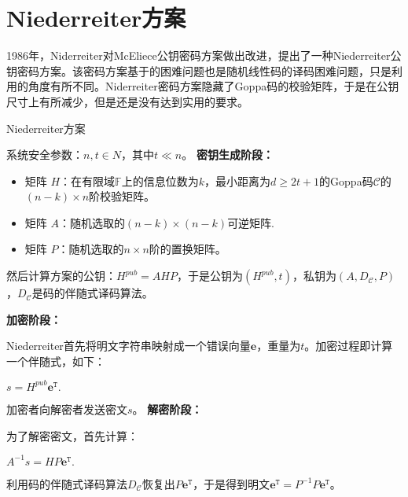 \section{Niederreiter方案}
1986年，Niderreiter对McEliece公钥密码方案做出改进，提出了一种Niederreiter公钥密码方案。该密码方案基于的困难问题也是随机线性码的译码困难问题，只是利用的角度有所不同。Niderreiter密码方案隐藏了Goppa码的校验矩阵，于是在公钥尺寸上有所减少，但是还是没有达到实用的要求。

\begin{breakablealgorithm}
	\small
	\renewcommand{\algorithmicrequire}{\textbf{Input:}}
	\renewcommand{\algorithmicensure}{\textbf{Output:}}
	\caption{Niederreiter方案}
	\label{alg:Niederreiter}
	\begin{algorithmic}
		\State
		系统安全参数：$n,t \in N$，其中$t \ll n$。
		\State
		\textbf{密钥生成阶段：}
		
		\begin{itemize}
			\item 矩阵 $H$：在有限域$\mathbb{F}$上的信息位数为$k$，最小距离为$d \geq 2t + 1$的Goppa码$\mathcal{C}$的$(n-k) \times n$阶校验矩阵。
			\item 矩阵 $A$：随机选取的$(n-k) \times (n-k)$可逆矩阵.
			\item 矩阵 $P$：随机选取的$n \times n$阶的置换矩阵。			
		\end{itemize}
	
		然后计算方案的公钥：$H^{pub} = AHP$，于是公钥为$(H^{pub}, t)$，私钥为$(A,D_\mathcal{C},P)$，$D_\mathcal{C}$是码的伴随式译码算法。
		
		\State
		\textbf{加密阶段：}
		
		Niederreiter首先将明文字符串映射成一个错误向量$\mathbf{e}$，重量为$t$。加密过程即计算一个伴随式，如下：
		
		\begin{center}
			$s = H^{pub}\mathbf{e}^\mathtt{T}.$
		\end{center}
		
		加密者向解密者发送密文$s$。
		\State
		\textbf{解密阶段：}
		
		为了解密密文，首先计算：
		\begin{center}
			$A^{-1}s = HP\mathbf{e}^\mathtt{T}.$
		\end{center}
	    利用码的伴随式译码算法$D_\mathcal{C}$恢复出$P\mathbf{e}^\mathtt{T}$，于是得到明文$\mathbf{e}^\mathtt{T} = P^{-1}P\mathbf{e}^\mathtt{T}$。		
	\end{algorithmic}
\end{breakablealgorithm}

